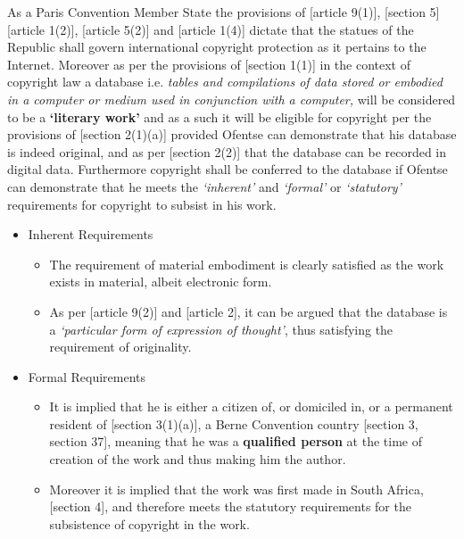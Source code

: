 \documentclass[11pt]{article}
\begin{document}
As a Paris Convention Member State the provisions of [article
9(1)]\cite{wto17_trips}, [section 5]\cite{rsa78_copyrightact} [article
1(2)]\cite{eurlex00_elec_commerce}, [article 5(2)]\cite{wipo86_berne} and [article
1(4)]\cite{wipo96_copyright_treaty} dictate that the statues of the Republic shall
govern international copyright protection as it pertains to the Internet.
Moreover as per the provisions of [section 1(1)]\cite{rsa78_copyrightact} in the
context of copyright law a database i.e. \emph{tables and compilations of data stored
or embodied in a computer or medium used in conjunction with a computer,} will
be considered to be a \textbf{`literary work'} and as a such it will be eligible for
copyright per the provisions of [section 2(1)(a)]\cite{rsa78_copyrightact}
provided Ofentse can demonstrate that his database is indeed original, and as
per [section 2(2)]\cite{rsa78_copyrightact} that the database can be recorded in
digital data. Furthermore copyright shall be conferred to the database if
Ofentse can demonstrate that he meets the \emph{`inherent'} and \emph{`formal'} or
\emph{`statutory'} requirements for copyright to subsist in his work.
\begin{itemize}
\item Inherent Requirements
\begin{itemize}
\item The requirement of material embodiment is clearly satisfied as the
work exists in material, albeit electronic form.
\item As per [article 9(2)]\cite{wto17_trips} and [article
2]\cite{wipo96_copyright_treaty}, it can be argued that the database is a
\emph{`particular form of expression of thought'}, thus satisfying the
requirement of originality.
\end{itemize}
\item Formal Requirements
\begin{itemize}
\item It is implied that he is either a citizen of, or domiciled in, or a
permanent resident of [section 3(1)(a)]\cite{rsa78_copyrightact}, a Berne
Convention country [section 3, section 37]\cite{wipo86_berne}, meaning that he
was a \textbf{qualified person} at the time of creation of the work and thus making
him the author.
\item Moreover it is implied that the work was first made in South Africa,
[section 4]\cite{rsa78_copyrightact}, and therefore meets the statutory
requirements for the subsistence of copyright in the work.
\end{itemize}
\end{itemize}
\end{document}
